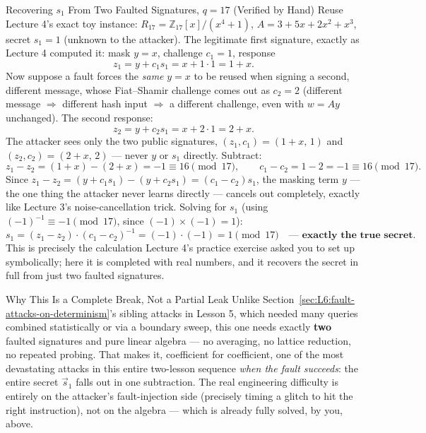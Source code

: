 \begin{exbox}{Recovering $s_1$ From Two Faulted Signatures, $q=17$ (Verified by Hand)}
Reuse Lecture 4's exact toy instance: $R_{17}=\mathbb{Z}_{17}[x]/(x^4+1)$, $A=3+5x+2x^2+x^3$, secret $s_1=1$ (unknown to the attacker). The legitimate first signature, exactly as Lecture 4 computed it: mask $y=x$, challenge $c_1=1$, response
$$
z_1 = y+c_1 s_1 = x+1\cdot 1 = 1+x.
$$
Now suppose a fault forces the \emph{same} $y=x$ to be reused when signing a second, different message, whose Fiat--Shamir challenge comes out as $c_2=2$ (different message $\Rightarrow$ different hash input $\Rightarrow$ a different challenge, even with $w=Ay$ unchanged). The second response:
$$
z_2 = y+c_2 s_1 = x+2\cdot 1 = 2+x.
$$
The attacker sees only the two public signatures, $(z_1,c_1)=(1+x,\,1)$ and $(z_2,c_2)=(2+x,\,2)$ --- never $y$ or $s_1$ directly. Subtract:
$$
z_1-z_2 = (1+x)-(2+x) = -1 \equiv 16 \pmod{17}, \qquad c_1-c_2 = 1-2=-1\equiv16\pmod{17}.
$$
Since $z_1-z_2 = (y+c_1s_1)-(y+c_2s_1) = (c_1-c_2)s_1$, the masking term $y$ --- the one thing the attacker never learns directly --- cancels out completely, exactly like Lecture 3's noise-cancellation trick. Solving for $s_1$ (using $(-1)^{-1}\equiv -1\pmod{17}$, since $(-1)\times(-1)=1$):
$$
s_1 = (z_1-z_2)\cdot(c_1-c_2)^{-1} = (-1)\cdot(-1) = 1 \pmod{17} \quad\textbf{--- exactly the true secret.}
$$
This is precisely the calculation Lecture 4's practice exercise asked you to set up symbolically; here it is completed with real numbers, and it recovers the secret in full from just two faulted signatures.
\end{exbox}

\begin{rmkbox}{Why This Is a Complete Break, Not a Partial Leak}
Unlike Section~\ref{sec:L6:fault-attacks-on-determinism}'s sibling attacks in Lesson 5, which needed many queries combined statistically or via a boundary sweep, this one needs exactly \textbf{two} faulted signatures and pure linear algebra --- no averaging, no lattice reduction, no repeated probing. That makes it, coefficient for coefficient, one of the most devastating attacks in this entire two-lesson sequence \emph{when the fault succeeds}: the entire secret $\vec s_1$ falls out in one subtraction. The real engineering difficulty is entirely on the attacker's fault-injection side (precisely timing a glitch to hit the right instruction), not on the algebra --- which is already fully solved, by you, above.
\end{rmkbox}

